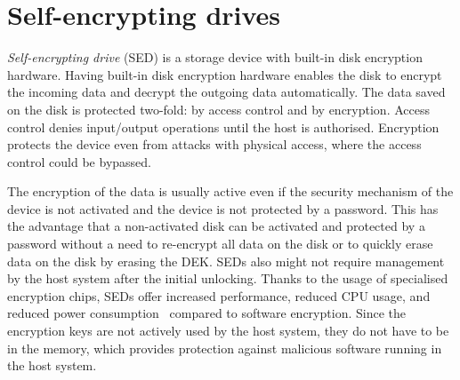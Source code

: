 \section{Self-encrypting drives}

\emph{Self-encrypting drive} (SED) is a storage device with built-in disk encryption hardware. Having built-in disk encryption hardware enables the disk to encrypt the incoming data and decrypt the outgoing data automatically. 
The data saved on the disk is protected two-fold: by access control and by encryption.
Access control denies input/output operations until the host is authorised.
Encryption protects the device even from attacks with physical access, where the access control could be bypassed.

The encryption of the data is usually active even if the security mechanism of the device is not activated and the device is not protected by a password. This has the advantage that a non-activated disk can be activated and protected by a password without a need to re-encrypt all data on the disk or to quickly erase data on the disk by erasing the DEK.
SEDs also might not require management by the host system after the initial unlocking. 
Thanks to the usage of specialised encryption chips, SEDs offer increased performance, reduced CPU usage, and reduced power consumption~\cite{comparing_the_power} compared to software encryption.
Since the encryption keys are not actively used by the host system, they do not have to be in the memory, which provides protection against malicious software running in the host system. 






